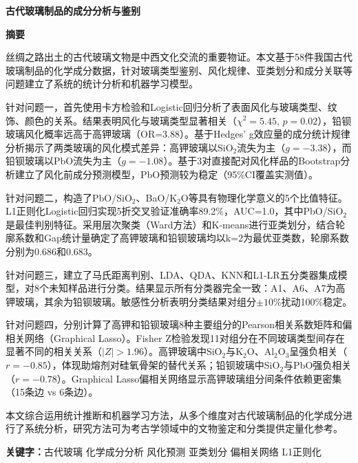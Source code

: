 \documentclass[fontset=windows, 12pt, a4paper]{ctexart}
\begin{document}
\thispagestyle{empty}
\begin{center}
{\fontsize{17.3pt}{22pt}\bfseries 古代玻璃制品的成分分析与鉴别}
\end{center}
\vspace{1em}

\thispagestyle{empty}
\begin{center}{\fontsize{14pt}{17pt}\bfseries 摘要}\end{center}

丝绸之路出土的古代玻璃文物是中西文化交流的重要物证。本文基于58件我国古代玻璃制品的化学成分数据，针对玻璃类型鉴别、风化规律、亚类划分和成分关联等问题建立了系统的统计分析和机器学习模型。

针对问题一，首先使用卡方检验和Logistic回归分析了表面风化与玻璃类型、纹饰、颜色的关系。结果表明风化与玻璃类型显著相关（$\chi^2=5.45$, $p=0.02$），铅钡玻璃风化概率远高于高钾玻璃（OR=3.88）。基于Hedges' g效应量的成分统计规律分析揭示了两类玻璃的风化模式差异：高钾玻璃以SiO$_2$流失为主（$g=-3.38$），而铅钡玻璃以PbO流失为主（$g=-1.08$）。基于3对直接配对风化样品的Bootstrap分析建立了风化前成分预测模型，PbO预测较为稳定（95\%CI覆盖实测值）。

针对问题二，构造了PbO/SiO$_2$、BaO/K$_2$O等具有物理化学意义的5个比值特征。L1正则化Logistic回归实现5折交叉验证准确率89.2\%，AUC=1.0，其中PbO/SiO$_2$是最佳判别特征。采用层次聚类（Ward方法）和K-means进行亚类划分，结合轮廓系数和Gap统计量确定了高钾玻璃和铅钡玻璃均以k=2为最优亚类数，轮廓系数分别为0.686和0.683。

针对问题三，建立了马氏距离判别、LDA、QDA、KNN和L1-LR五分类器集成模型，对8个未知样品进行分类。结果显示所有分类器完全一致：A1、A6、A7为高钾玻璃，其余为铅钡玻璃。敏感性分析表明分类结果对组分$\pm10\%$扰动100\%稳定。

针对问题四，分别计算了高钾和铅钡玻璃8种主要组分的Pearson相关系数矩阵和偏相关网络（Graphical Lasso）。Fisher Z检验发现11对组分在不同玻璃类型间存在显著不同的相关关系（$|Z|>1.96$）。高钾玻璃中SiO$_2$与K$_2$O、Al$_2$O$_3$呈强负相关（$r=-0.85$），体现助熔剂对硅氧骨架的替代关系；铅钡玻璃中SiO$_2$与PbO强负相关（$r=-0.78$）。Graphical Lasso偏相关网络显示高钾玻璃组分间条件依赖更密集（15条边 vs 6条边）。

本文综合运用统计推断和机器学习方法，从多个维度对古代玻璃制品的化学成分进行了系统分析，研究方法可为考古学领域中的文物鉴定和分类提供定量化参考。

{\heiti\bfseries 关键字：}古代玻璃 \quad 化学成分分析 \quad 风化预测 \quad 亚类划分 \quad 偏相关网络 \quad L1正则化
\newpage
\end{document}
